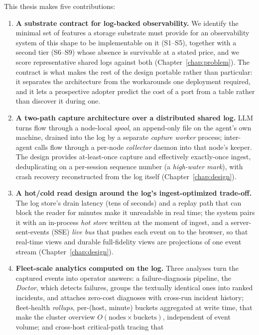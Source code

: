 This thesis makes five contributions:

\begin{enumerate}
\item \textbf{A substrate contract for log-backed observability.} We
  identify the minimal set of features a storage substrate must provide for
  an observability system of this shape to be implementable on it (S1--S5),
  together with a second tier (S6--S9) whose absence is survivable at a
  stated price, and we score representative shared logs against both
  (Chapter~\ref{chap:problem}). The contract is what makes the rest of the
  design portable rather than particular: it separates the architecture from
  the workarounds one deployment required, and it lets a prospective adopter
  predict the cost of a port from a table rather than discover it during one.
\item \textbf{A two-path capture architecture over a distributed shared log.}
  LLM turns flow through a node-local \emph{spool}, an append-only file on
  the agent's own machine, drained into the log by a separate
  \emph{capture worker} process; inter-agent calls flow through a per-node
  \emph{collector} daemon into that node's keeper. The design provides
  at-least-once capture and effectively exactly-once ingest, deduplicating
  on a per-session sequence number (a \emph{high-water mark}), with crash
  recovery reconstructed from the log itself (Chapter~\ref{chap:design}).
\item \textbf{A hot/cold read design around the log's ingest-optimized
  trade-off.} The log store's drain latency (tens of seconds) and a
  replay path that can block the reader for minutes make it
  unreadable in real time; the system pairs it with an in-process
  \emph{hot store} written at the moment of ingest, and a
  server-sent-events (SSE) \emph{live bus} that pushes each event on to the
  browser, so that real-time views and durable
  full-fidelity views are projections of one event stream
  (Chapter~\ref{chap:design}).
\item \textbf{Fleet-scale analytics computed on the log.} Three analyses turn
  the captured events into operator answers: a failure-diagnosis pipeline,
  the \emph{Doctor}, which detects
  failures, groups the textually identical ones into ranked incidents, and
  attaches zero-cost diagnoses with cross-run incident history; fleet-health
  \emph{rollups}, per-(host, minute) buckets aggregated at write time, that
  make the cluster overview $O(\mathrm{nodes}\times\mathrm{buckets})$,
  independent of event volume; and cross-host critical-path tracing that

\end{enumerate}
